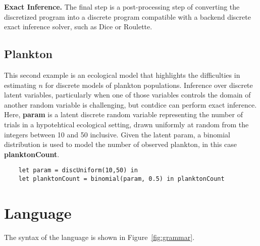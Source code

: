 \documentclass[nonacm,anonymous]{acmart}
\newcommand{\CDice}{\text{\scshape CDice}\xspace}
\begin{document}
\textbf{Exact Inference.} The final step is a post-processing step of converting the discretized program into a discrete program compatible with a backend discrete exact inference solver, such as Dice or Roulette.

\subsection{Plankton}
This second example is an ecological model that highlights the difficulties in estimating $n$ for discrete models of plankton populations. Inference over discrete latent variables, particularly when one of those variables controls the domain of another random variable is challenging, but contdice can perform exact inference. Here, \textbf{param} is a latent discrete random variable representing the number of trials in a hypotehtical ecological setting, drawn uniformly at random from the integers between 10 and 50 inclusive. Given the latent param, a binomial distribution is used to model the number of observed plankton, in this case \textbf{planktonCount}.

\begin{lstlisting}
    let param = discUniform(10,50) in
    let planktonCount = binomial(param, 0.5) in planktonCount
\end{lstlisting}



\section{Language}

The syntax of the \CDice language is shown in Figure~\ref{fig:grammar}.
\end{document}
